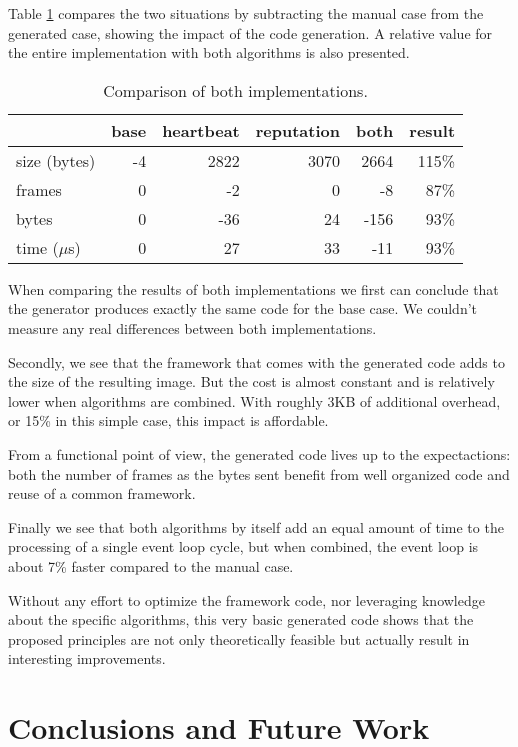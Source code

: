 \documentclass[conference]{IEEEtran}
\begin{document}
Table \ref{tbl:summary} compares the two situations by subtracting the manual
case from the generated case, showing the impact of the code generation. A
relative value for the entire implementation with both algorithms is also
presented.

\begin{table}[H]
  \centering
  \begin{tabular}{lrrrrr}
  \hline
                & base & heartbeat & reputation & both  & result \\
  \hline
  size (bytes)  & -4    & 2822     & 3070       & 2664  & 115\%  \\
  frames        & 0     & -2       & 0          & -8    & 87\%   \\
  bytes         & 0     & -36      & 24         & -156  & 93\%   \\
  time ($\mu$s) & 0     & 27       & 33         & -11   & 93\%   \\
  \hline
  \end{tabular}
  \caption{Comparison of both implementations.}
  \label{tbl:summary}
\end{table}

When comparing the results of both implementations we first can conclude that
the generator produces exactly the same code for the base case. We couldn't
measure any real differences between both implementations.

Secondly, we see that the framework that comes with the generated code adds to
the size of the resulting image. But the cost is almost constant and is
relatively lower when algorithms are combined. With roughly 3KB of additional
overhead, or 15\% in this simple case, this impact is affordable.

From a functional point of view, the generated code lives up to the
expectactions: both the number of frames as the bytes sent benefit from well
organized code and reuse of a common framework.

Finally we see that both algorithms by itself add an equal amount of time to
the processing of a single event loop cycle, but when combined, the event loop
is about 7\% faster compared to the manual case.

Without any effort to optimize the framework code, nor leveraging knowledge
about the specific algorithms, this very basic generated code shows that the
proposed principles are not only theoretically feasible but actually result in
interesting improvements.

\section{Conclusions and Future Work}
\label{section:conclusions}
\end{document}
